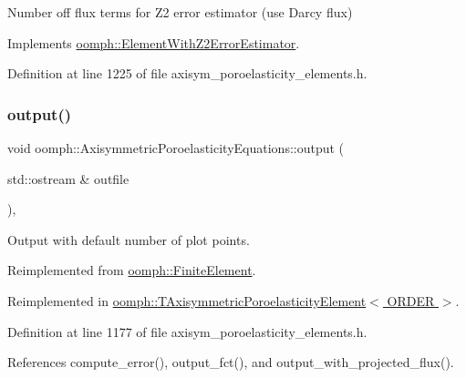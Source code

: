 Number off flux terms for Z2 error estimator (use Darcy flux) 



Implements \hyperlink{classoomph_1_1ElementWithZ2ErrorEstimator_ae82c5728902e13da31be19c390fc28e3}{oomph\+::\+Element\+With\+Z2\+Error\+Estimator}.



Definition at line 1225 of file axisym\+\_\+poroelasticity\+\_\+elements.\+h.

\mbox{\label{classoomph_1_1AxisymmetricPoroelasticityEquations_afb277eef2c340f6fa432eefa415aedf7}} 
\subsubsection{\texorpdfstring{output()}{output()}\hspace{0.1cm}{\footnotesize\ttfamily [1/2]}}
{\footnotesize\ttfamily void oomph\+::\+Axisymmetric\+Poroelasticity\+Equations\+::output (\begin{DoxyParamCaption}\item[{std\+::ostream \&}]{outfile }\end{DoxyParamCaption})\hspace{0.3cm}{\ttfamily [inline]}, {\ttfamily [virtual]}}



Output with default number of plot points. 



Reimplemented from \hyperlink{classoomph_1_1FiniteElement_a2ad98a3d2ef4999f1bef62c0ff13f2a7}{oomph\+::\+Finite\+Element}.



Reimplemented in \hyperlink{classoomph_1_1TAxisymmetricPoroelasticityElement_ab7754062a0e98148d1a1bdf153353772}{oomph\+::\+T\+Axisymmetric\+Poroelasticity\+Element$<$ O\+R\+D\+E\+R $>$}.



Definition at line 1177 of file axisym\+\_\+poroelasticity\+\_\+elements.\+h.



References compute\+\_\+error(), output\+\_\+fct(), and output\+\_\+with\+\_\+projected\+\_\+flux().



